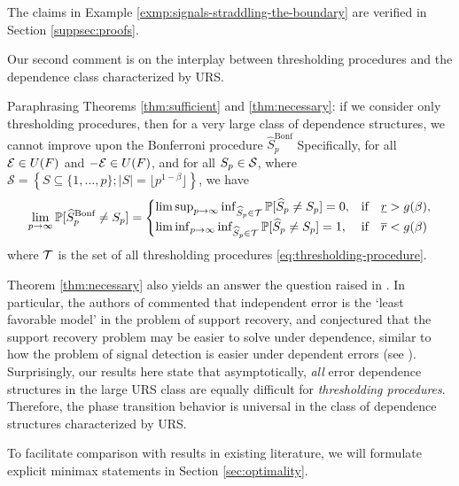 The claims in Example \ref{exmp:signals-straddling-the-boundary} are verified in Section \ref{suppsec:proofs}. 

Our second comment is on the interplay between thresholding procedures and the dependence class characterized by URS.
\begin{remark} \label{rmk:dependence-assumptions}
Paraphrasing Theorems \ref{thm:sufficient} and \ref{thm:necessary}: 
if we consider only thresholding procedures, then for a very large class of dependence structures, we cannot improve upon the Bonferroni procedure $\widehat{S}_p^{\text{Bonf}}$ 
Specifically, for all ${\cal E}\in U(F)$ and ${-\cal E}\in U(F)$, and for all $S_p\in {\cal S}$, where $\mathcal{S} = \left\{S\subseteq\{1,\ldots,p\};|S|=\lfloor p^{1-\beta}\rfloor\right\}$, we have
\begin{equation}
    \lim_{p\to\infty} \P[\widehat{S}_p^{\text{Bonf}}\neq S_p]
    = \begin{cases}
    \limsup_{p\to\infty} \inf_{\widehat{S}_p \in {\cal T}} \P[\widehat{S}_p\neq S_p] = 0, & \text{if}\quad \underline{r} > g(\beta),\\
    \liminf_{p\to\infty} \inf_{\widehat{S}_p \in {\cal T}} \P[\widehat{S}_p\neq S_p] = 1, & \text{if}\quad \overline{r} < g(\beta)\\
    \end{cases}
\end{equation}
where $\cal T$ is the set of all thresholding procedures \eqref{eq:thresholding-procedure}. 

Theorem \ref{thm:necessary} also yields an answer the question raised in \citet{butucea2018variable}.
In particular, the authors of \citep{butucea2018variable} commented that independent error is the  `least favorable model' in the problem of support recovery, and 
conjectured that the support recovery problem may be easier to solve under dependence, similar to how the problem of signal detection is easier under dependent 
errors (see \cite{hall2010innovated}). 
Surprisingly, our results here state that asymptotically, \emph{all} error dependence structures in the large URS class are equally difficult for \emph{thresholding procedures}. Therefore, the phase transition behavior is universal in the class of dependence structures characterized by URS.

To facilitate comparison with results in existing literature, we will formulate explicit minimax statements in Section \ref{sec:optimality}.
\end{remark}

